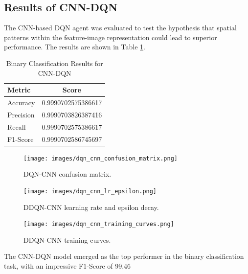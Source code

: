 \documentclass[12pt]{report}
\begin{document}
\newpage
\subsection{Results of CNN-DQN}
The CNN-based DQN agent was evaluated to test the hypothesis that spatial patterns within the feature-image representation could lead to superior performance. The results are shown in Table \ref{tab:binary_cnn_dqn_results}.

\begin{table}[H]
    \centering
    \caption{Binary Classification Results for CNN-DQN}
    \label{tab:binary_cnn_dqn_results}
    \begin{tabular}{@{}lc@{}}
        \toprule
        \textbf{Metric} & \textbf{Score} \\
        \midrule
        Accuracy & 0.9990702575386617 \\
        Precision & 0.9990703826387416 \\
        Recall & 0.9990702575386617 \\
        F1-Score & 0.9990702586745697 \\
        \bottomrule
    \end{tabular}
\end{table}

\begin{figure}[htbp]
    \centering
    \texttt{[image: images/dqn\_cnn\_confusion\_matrix.png]}
    \caption{DQN-CNN confusion matrix.}
    \label{fig:dqn_cnn_confusion}
\end{figure}

\vspace{0.5cm}

\begin{figure}[htbp]
    \centering
    \texttt{[image: images/dqn\_cnn\_lr\_epsilon.png]}
    \caption{DDQN-CNN learning rate and epsilon decay.}
    \label{fig:dqn_cnn_lr_epsilon_cnn}
\end{figure}

\vspace{0.5cm}

\begin{figure}[htbp]
    \centering
    \texttt{[image: images/dqn\_cnn\_training\_curves.png]}
    \caption{DDQN-CNN training curves.}
    \label{fig:dqn_cnn_training_curves}
\end{figure}

The CNN-DQN model emerged as the top performer in the binary classification task, with an impressive F1-Score of 99.46
\end{document}
